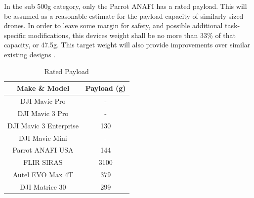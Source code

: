 In the sub 500g category, only the Parrot ANAFI has a rated payload. This will be assumed as a reasonable estimate for the
payload capacity of similarly sized drones. In order to leave some margin for safety, and possible additional task-specific
modifications, this devices weight shall be no more than 33\% of that capacity, or 47.5g. This target weight will also 
provide improvements over similar existing designs \cite{chi_optimized_2014,nguyen_passively_2019}.

\begin{table}[H]
    \centering
    \caption{Rated Payload}
    \begin{tabular}{| c | c |}
        \hline
        {Make \& Model} & Payload (g) \\
        \hline
        DJI Mavic Pro & - \\
        DJI Mavic 3 Pro & - \\
        DJI Mavic 3 Enterprise & 130 \\
        DJI Mavic Mini & - \\
        Parrot ANAFI USA & 144 \\
        FLIR SIRAS & 3100 \\
        Autel EVO Max 4T & 379 \\
        DJI Matrice 30 & 299 \\
        \hline
    \end{tabular}
    \label{tab:payload}
\end{table}


